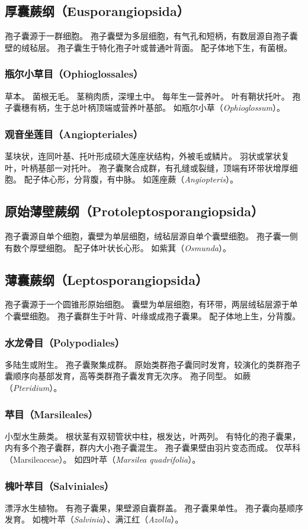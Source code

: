 \documentclass[11pt]{article}
\begin{document}
\begin{sloppypar}
\subsection{厚囊蕨纲（Eusporangiopsida）}
孢子囊源于一群细胞。
孢子囊壁为多层细胞，有气孔和短柄，有数层源自孢子囊壁的绒毡层。
孢子囊生于特化孢子叶或普通叶背面。
配子体地下生，有菌根。

\subsubsection{瓶尔小草目（Ophioglossales）}
草本。
菌根无毛。
茎稍肉质，深埋土中。
每年生一营养叶。
叶有鞘状托叶。
孢子囊穗有柄，生于总叶柄顶端或营养叶基部。
如瓶尔小草（\textit{Ophioglossum}）。

\subsubsection{观音坐莲目（Angiopteriales）}
茎块状，连同叶基、托叶形成硕大莲座状结构，外被毛或鳞片。
羽状或掌状复叶，叶柄基部一对托叶。
孢子囊聚合成群，有孔缝或裂缝，顶端有环带状增厚细胞。
配子体心形，分背腹，有中脉。
如莲座蕨（\textit{Angiopteris}）。

\subsection{原始薄壁蕨纲（Protoleptosporangiopsida）}
孢子囊源自单个细胞，囊壁为单层细胞，绒毡层源自单个囊壁细胞。
孢子囊一侧有数个厚壁细胞。
配子体叶状长心形。
如紫萁（\textit{Osmunda}）。

\subsection{薄囊蕨纲（Leptosporangiopsida）}
孢子囊源于一个圆锥形原始细胞。
囊壁为单层细胞，有环带，两层绒毡层源于单个囊壁细胞。
孢子囊群生于叶背、叶缘或成孢子囊果。
配子体地上生，分背腹。

\subsubsection{水龙骨目（Polypodiales）}
多陆生或附生。
孢子囊聚集成群。
原始类群孢子囊同时发育，较演化的类群孢子囊顺序向基部发育，高等类群孢子囊发育无次序。
孢子同型。
如蕨（\textit{Pteridium}）。

\subsubsection{苹目（Marsileales）}
小型水生蕨类。
根状茎有双韧管状中柱，根发达，叶两列。
有特化的孢子囊果，内有多个孢子囊群，群内大小孢子囊混生。
孢子囊果壁由羽片变态而成。
仅苹科（Marsileaceae）。
如四叶苹（\textit{Marsilea quadrifolia}）。

\subsubsection{槐叶苹目（Salviniales）}
漂浮水生植物。
有孢子囊果，果壁源自囊群盖。
孢子囊果单性。
孢子囊向基顺序发育。
如槐叶苹（\textit{Salvinia}）、满江红（\textit{Azolla}）。

\end{sloppypar}
\end{document}
